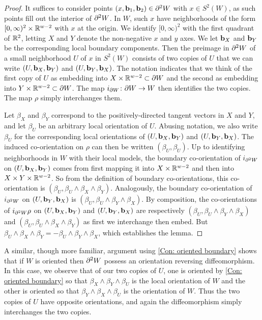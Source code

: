 \begin{proof}
	It suffices to consider points $(x,\mathbf{b}_1,\mathbf{b}_2) \in \partial^2 W$ with $x \in S^2(W)$, as such points fill out the interior of $\partial^2 W$.
	In $W$, such $x$ have neighborhoods of the form $[0,\infty)^2 \times \mathbb{R}^{w-2}$ with $x$ at the origin.
	We identify $[0,\infty)^2$ with the first quadrant of $\mathbb{R}^2$, letting $X$ and $Y$ denote the non-negative $x$ and $y$ axes.
	We let $\mathbf{b}_X$ and $\mathbf{b}_Y$ be the corresponding local boundary components.
	Then the preimage in $\partial^2 W$ of a small neighborhood $U$ of $x$ in $S^2(W)$ consists of two copies of $U$ that we can write $(U,\mathbf{b}_X,\mathbf{b}_Y)$ and $(U,\mathbf{b}_Y,\mathbf{b}_X)$.
	The notation indicates that we think of the first copy of $U$ as embedding into $X \times \mathbb{R}^{w-2} \subset \partial W$ and the second as embedding into $Y \times \mathbb{R}^{w-2} \subset \partial W$.
	The map $i_{\partial W} \colon \partial W \to W$ then identifies the two copies.
	The map $\rho$ simply interchanges them.

	Let $\beta_X$ and $\beta_Y$ correspond to the positively-directed tangent vectors in $X$ and $Y$, and let $\beta_U$ be an arbitrary local orientation of $U$.
	Abusing notation, we also write $\beta_U$ for the corresponding local orientations of $(U,\mathbf{b}_X,\mathbf{b}_Y)$ and $(U,\mathbf{b}_Y,\mathbf{b}_X)$.
	The induced co-orientation on $\rho$ can then be written $(\beta_U,\beta_U)$.
	Up to identifying neighborhoods in $W$ with their local models, the boundary co-orientation of $i_{\partial^2 W}$ on $(U,\mathbf{b}_X,\mathbf{b}_Y)$ comes from first mapping it into $X \times \mathbb{R}^{w-2}$ and then into $X \times Y \times \mathbb{R}^{w-2}$.
	So from the definition of boundary co-orientations, this co-orientation is $(\beta_U, \beta_U \wedge \beta_X \wedge \beta_Y)$.
	Analogously, the boundary co-orientation of $i_{\partial^2 W}$ on $(U,\mathbf{b}_Y,\mathbf{b}_X)$ is $(\beta_U, \beta_U \wedge \beta_Y \wedge \beta_X)$.
	By composition, the co-orientations of $i_{\partial^2 W}\rho$ on $(U,\mathbf{b}_X,\mathbf{b}_Y)$ and $(U,\mathbf{b}_Y,\mathbf{b}_X)$ are respectively $(\beta_U, \beta_U \wedge \beta_Y \wedge \beta_X)$ and $(\beta_U, \beta_U \wedge \beta_X \wedge \beta_Y)$ as first we interchange then embed.
	But $\beta_U \wedge \beta_X \wedge \beta_Y = -\beta_U \wedge \beta_Y \wedge \beta_X$, which establishes the lemma.
\end{proof}

\begin{remark}\label{R: bd2 oriented}
	A similar, though more familiar, argument using \cref{Con: oriented boundary} shows that if $W$ is oriented then $\partial^2 W$ possess an orientation reversing diffeomorphism.
	In this case, we observe that of our two copies of $U$, one is oriented by \cref{Con: oriented boundary} so that $\beta_X \wedge \beta_Y \wedge \beta_U$ is the local orientation of $W$ and the other is oriented so that $\beta_Y \wedge \beta_X \wedge \beta_U$ is the orientation of $W$.
	Thus the two copies of $U$ have opposite orientations, and again the diffeomorphism simply interchanges the two copies.
\end{remark}

